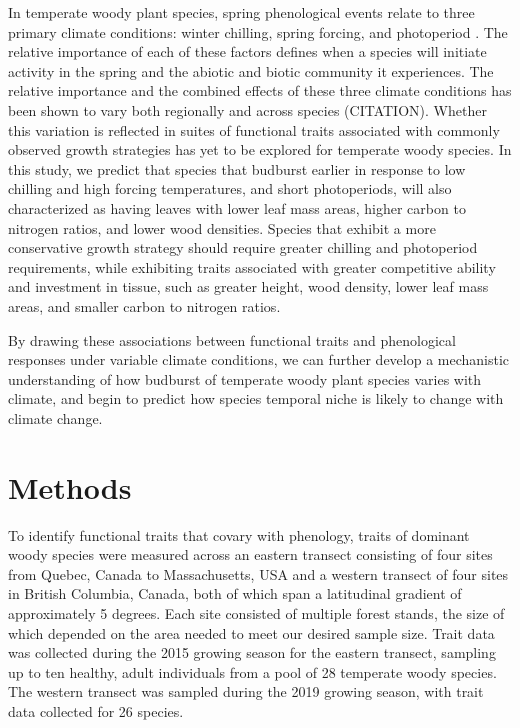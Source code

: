 \documentclass[11pt,a4paper,oneside]{article}
\begin{document}
\par In temperate woody plant species, spring phenological events relate to three primary climate conditions: winter chilling, spring forcing, and photoperiod \cite{Chuine2016}. The relative importance of each of these factors defines when a species will initiate activity in the spring and the abiotic and biotic community it experiences. The relative importance and the combined effects of these three climate conditions has been shown to vary both regionally and across species (CITATION). Whether this variation is reflected in suites of functional traits associated with commonly observed growth strategies has yet to be explored for temperate woody species. In this study, we predict that species that budburst earlier in response to low chilling and high forcing temperatures, and short photoperiods, will also characterized as having leaves with lower leaf mass areas, higher carbon to nitrogen ratios, and lower wood densities. Species that exhibit a more conservative growth strategy should require greater chilling and photoperiod requirements, while exhibiting traits associated with greater competitive ability and investment in tissue, such as greater height, wood density, lower leaf mass areas, and smaller carbon to nitrogen ratios.

By drawing these associations between functional traits and phenological responses under variable climate conditions, we can further develop a mechanistic understanding of how budburst of temperate woody plant species varies with climate, and begin to predict how species temporal niche is likely to change with climate change. 

\section*{Methods}
\par To identify functional traits that covary with phenology, traits of dominant woody species were measured across an eastern transect consisting of four sites from Quebec, Canada to Massachusetts, USA and a western transect of four sites in British Columbia, Canada, both of which span a latitudinal gradient of approximately 5 degrees. Each site consisted of multiple forest stands, the size of which depended on the area needed to meet our desired sample size.  Trait data was collected during the 2015 growing season for the eastern transect, sampling up to ten healthy, adult individuals from a pool of 28 temperate woody species. The western transect was sampled during the 2019 growing season, with trait data collected for 26 species. 
\end{document}
